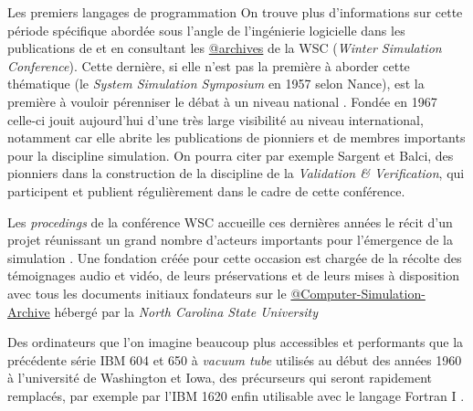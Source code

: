 \begin{testiv}{Les premiers langages de programmation}{}
On trouve plus d'informations sur cette période spécifique abordée sous l'angle de l'ingénierie logicielle dans les publications de \textcites{Nance2013,Nance1993, Araten1992, Nance2002} et en consultant les \href{http://informs-sim.org/}{@archives} de la WSC (\textit{Winter Simulation Conference}). Cette dernière, si elle n'est pas la première à aborder cette thématique (le \textit{System Simulation Symposium} en 1957 selon Nance), est la première à vouloir pérenniser le débat à un niveau national \autocite{Nance2002}. Fondée en 1967 \autocite{Crain1992, Araten1992} celle-ci jouit aujourd'hui d'une très large visibilité au niveau international, notamment car elle abrite les publications de pionniers et de membres importants pour la discipline simulation. On pourra citer par exemple Sargent et Balci, des pionniers dans la construction de la discipline de la \textit{Validation \& Verification}, qui participent et publient régulièrement dans le cadre de cette conférence. 

Les \textit{procedings} de la conférence WSC accueille ces dernières années le récit d'un projet réunissant un grand nombre d'acteurs importants pour l'émergence de la simulation \autocite{Nance2013}. Une fondation créée pour cette occasion est chargée de la récolte des témoignages audio et vidéo, de leurs préservations et de leurs mises à disposition avec tous les documents initiaux fondateurs sur le \href{http://d.lib.ncsu.edu/computer-simulation/}{@Computer-Simulation-Archive} hébergé par la \textit{North Carolina State University}

\end{testiv}


Des ordinateurs que l'on imagine beaucoup plus accessibles et performants que la précédente série IBM 604 et 650  \autocite[584]{Barnes2004} à \textit{vacuum tube} utilisés au début des années 1960 à l'université de Washington  et Iowa, des précurseurs qui seront rapidement remplacés, par exemple par l'IBM 1620 enfin utilisable avec le langage Fortran I \autocite[66]{Berry2005}. 

